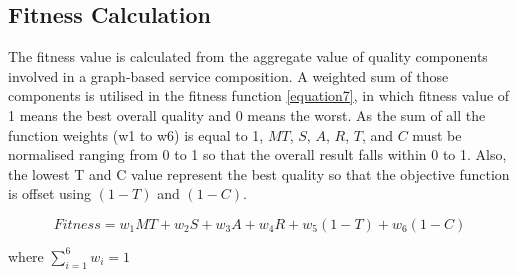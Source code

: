 \documentclass{llncs}
\begin{document}
\subsection{Fitness Calculation}
The fitness value is calculated from the aggregate value of quality components involved in a graph-based service composition. A weighted sum of those components is utilised in the fitness function \ref{equation7}, in which fitness value of 1 means the best overall quality and 0 means the worst. As the sum of all the function weights (w1 to w6) is equal to 1, $MT$, $S$, $A$, $R$, $T$, and $C$ must be normalised ranging from 0 to 1 so that the overall result falls within 0 to 1. Also, the lowest T and C value represent the best quality so that the objective function is offset using $(1 - T)$ and $(1 - C)$.

\begin{equation}
\label{equation7}
Fitness = w_1MT + w_2S + w_3A + w_4R + w_5(1 - T) + w_6(1 - C)
\end{equation}

\noindent where $\sum_{i=1}^{6} w_i = 1$
\end{document}
